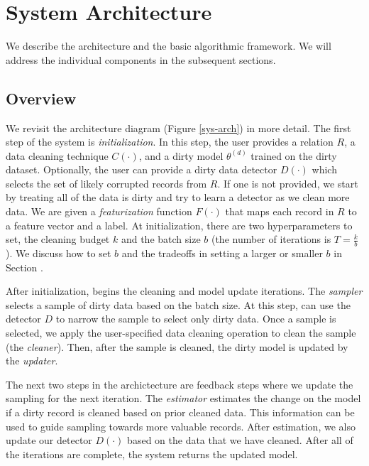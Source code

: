 \section{System Architecture}\label{arch}
We describe the \sys architecture and the basic algorithmic framework.
We will address the individual components in the subsequent sections.

\subsection{Overview}
We revisit the architecture diagram (Figure \ref{sys-arch}) in more detail.
The first step of the system is \emph{initialization}.
In this step, the user provides a relation $R$, a data cleaning technique $C(\cdot)$, and a dirty model $\theta^{(d)}$ trained on the dirty dataset. 
Optionally, the user can provide a dirty data detector $D(\cdot)$ which selects the set of likely corrupted records from $R$.
If one is not provided, we start by treating all of the data is dirty and try to learn a detector as we clean more data.
We are given a \emph{featurization} function $F(\cdot)$ that maps each record in $R$ to a feature vector and a label.
At initialization, there are two hyperparameters to set, the cleaning budget $k$ and the batch size $b$ (the number of iterations is $T = \frac{k}{b}$).
We discuss how to set $b$ and the tradeoffs in setting a larger or smaller $b$ in Section \label{model-update}.

After initialization, \sys begins the cleaning and model update iterations.
The \emph{sampler} selects a sample of dirty data based on the batch size.
At this step, \sys can use the detector $D$ to narrow the sample to select only dirty data.
Once a sample is selected, we apply the user-specified data cleaning operation to clean the sample (the \emph{cleaner}).
Then, after the sample is cleaned, the dirty model is updated by the \emph{updater}.

The next two steps in the archictecture are feedback steps where we update the sampling for the next iteration.
The \emph{estimator} estimates the change on the model if a dirty record is cleaned based on prior cleaned data.
This information can be used to guide sampling towards more valuable records.
After estimation, we also update our detector $D(\cdot)$ based on the data that we have cleaned.
After all of the iterations are complete, the system returns the updated model.

